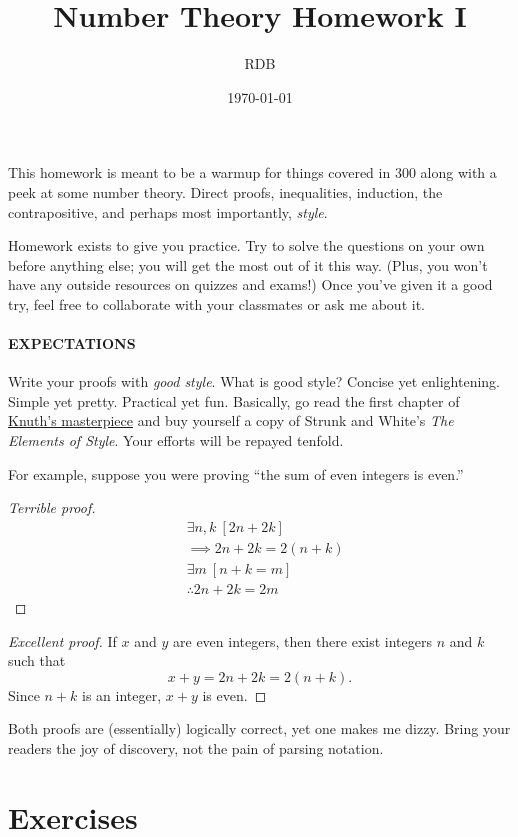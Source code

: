 \documentclass[12pt]{rudin}
\title{Number Theory Homework I}
\author{RDB}
\date{\today}
\begin{document}
\maketitle

This homework is meant to be a warmup for things covered in 300 along with a
peek at some number theory. Direct proofs, inequalities, induction, the
contrapositive, and perhaps most importantly, \emph{style}.

Homework exists to give you practice. Try to solve the questions on your own
before anything else; you will get the most out of it this way. (Plus, you
won't have any outside resources on quizzes and exams!) Once you've given it a
good try, feel free to collaborate with your classmates or ask me about it.

\paragraph{EXPECTATIONS} Write your proofs with \emph{good style}. What is good
style? Concise yet enlightening. Simple yet pretty. Practical yet fun. 
Basically, go read the first chapter of
\href{https://jmlr.csail.mit.edu/reviewing-papers/knuth_mathematical_writing.pdf}{Knuth's masterpiece}
and buy yourself a copy of Strunk and White's \emph{The Elements of Style}.
Your efforts will be repayed tenfold.

For example, suppose you were proving ``the sum of even integers is even.''
\begin{proof}[Terrible proof]
\begin{align*}
    &\exists n, k \ [2n + 2k] \\
    &\implies 2n + 2k = 2(n + k) \\
    &\exists m \ [n + k = m] \\
    &\therefore 2n + 2k = 2m
\end{align*}
\end{proof}
\begin{proof}[Excellent proof]
    If $x$ and $y$ are even integers, then there exist integers $n$ and $k$
    such that
    \begin{equation*}
        x + y = 2n + 2k = 2(n + k).
    \end{equation*}
    Since $n + k$ is an integer, $x + y$ is even.
\end{proof}
Both proofs are (essentially) logically correct, yet one makes me dizzy. Bring
your readers the joy of discovery, not the pain of parsing notation.

\section*{Exercises}%
\label{sec:exercises}
\end{document}
